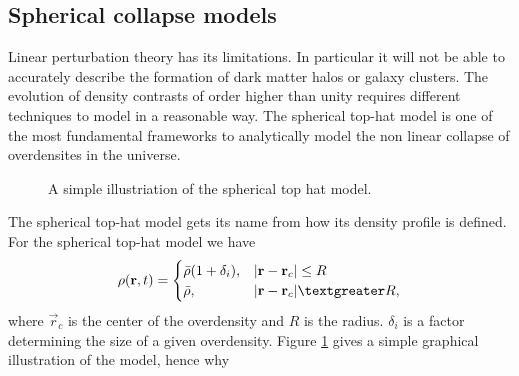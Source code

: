 \subsection{Spherical collapse models}
Linear perturbation theory has its limitations. In particular it will not be
able to accurately describe the formation of dark matter halos or galaxy
clusters. The evolution of density contrasts of order higher than unity requires
different techniques to model in a reasonable way. The spherical top-hat model
is one of the most fundamental frameworks to analytically model the non linear
collapse of overdensites in the universe.
\begin{figure}\label{fig:tophat}
    \caption{A simple illustriation of the spherical top hat model.}
\end{figure}
The spherical top-hat model gets its name from how its density profile is
defined. For the spherical top-hat model we have
\begin{equation}
    \rho(\vec{r},t) =
    \begin{cases} 
        \bar{\rho}(1+\delta_i), & \vert\vec{r}-\vec{r}_c\vert\leq R \\
        \bar{\rho}, & \vert\vec{r}-\vec{r}_c\vert \textgreater R,
     \end{cases} 
\end{equation}
where $\vec{r}_c$ is the center of the overdensity and $R$ is the radius.
$\delta_i$ is a factor determining the size of a given overdensity. Figure
\ref{fig:tophat} gives a simple graphical illustration of the model, hence why
